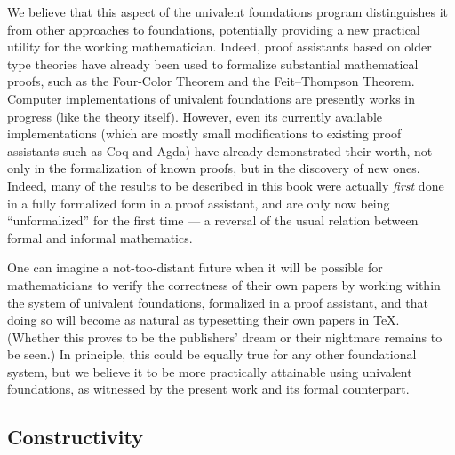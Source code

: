 We believe that this aspect of the univalent foundations program distinguishes it from other approaches to foundations, potentially providing a new practical utility for the working mathematician.
Indeed, proof assistants based on older type theories have already been used to formalize substantial mathematical proofs, such as the Four-Color Theorem and the Feit--Thompson Theorem.
Computer implementations of univalent foundations are presently works in progress (like the theory itself).
However, even its currently available implementations (which are mostly small modifications to existing proof assistants such as Coq and Agda) have already demonstrated their worth, not only in the formalization of known proofs, but in the discovery of new ones.
Indeed, many of the results to be described in this book were actually \emph{first} done in a fully formalized form in a proof assistant, and are only now being ``unformalized'' for the first time --- a reversal of the usual relation between formal and informal mathematics.

One can imagine a not-too-distant future when it will be possible for mathematicians to verify the correctness of their own papers by working within the system of univalent foundations, formalized in a proof assistant, and that doing so will become as natural as typesetting their own papers in \TeX.
(Whether this proves to be the publishers' dream or their nightmare remains to be seen.) 
In principle, this could be equally true for any other foundational system, but we believe it to be more practically attainable using univalent foundations, as witnessed by the present work and its formal counterpart.



\subsection*{Constructivity} 


